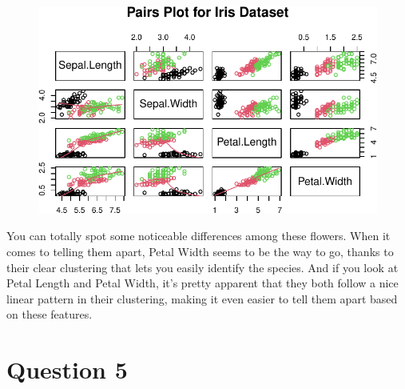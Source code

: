 \documentclass[
  letterpaper,
  DIV=11,
  numbers=noendperiod]{scrartcl}
\begin{document}
\begin{figure}[H]

{\centering \includegraphics{CervantesAlvarez_Brian_HW1_ST557_files/figure-pdf/unnamed-chunk-18-1.pdf}

}

\end{figure}

You can totally spot some noticeable differences among these flowers.
When it comes to telling them apart, Petal Width seems to be the way to
go, thanks to their clear clustering that lets you easily identify the
species. And if you look at Petal Length and Petal Width, it's pretty
apparent that they both follow a nice linear pattern in their
clustering, making it even easier to tell them apart based on these
features.

\newpage{}

\hypertarget{question-5}{%
\section{Question 5}\label{question-5}}
\end{document}
